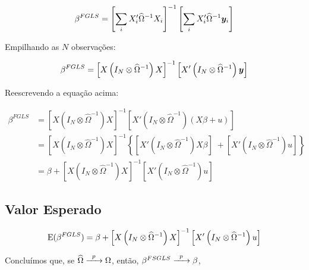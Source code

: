 \documentclass[11pt, oneside, a4paper, article]{article}
\numberwithin{equation}{section}
\begin{document}
\vspace{-1.5 em}
\begin{align*}
	\beta^{FGLS}
	= 
	\left[ 
		\sum_{i} X_{i}' \widehat{\Omega}^{-1} X_{i}
	\right]^{-1}
	\left[ 
		\sum_{i} X_{i}' \widehat{\Omega}^{-1} \boldsymbol{y}_{i}
	\right]
\end{align*}

Empilhando as $N$ observações:

\vspace{-1.5 em}
\begin{align*}
\beta^{FGLS}
= 
\left[ X \left( I_{N} \otimes \widehat{\Omega}^{-1} \right) X \right]^{-1}
\left[ X' \left( I_{N} \otimes \widehat{\Omega}^{-1} \right) \boldsymbol{y} \right]
\end{align*}

Reescrevendo a equação acima:

\vspace{-1.5 em}
\begin{align*}
\beta^{FGLS}
&= 
\left[  X \left( I_{N} \otimes \widehat{\Omega}^{-1} \right) X \right]^{-1}
\left[  X' \left( I_{N} \otimes \widehat{\Omega}^{-1} \right) (X \beta + u) \right]
\\
&= 
\left[ X \left( I_{N} \otimes \widehat{\Omega}^{-1} \right) X \right]^{-1}
\left\{ 
\left[ X' \left( I_{N} \otimes \widehat{\Omega}^{-1} \right) X \beta \right]
\; +
\left[ X' \left( I_{N} \otimes \widehat{\Omega}^{-1} \right) u \right]
\right\}
\\
&= 
\beta +
\left[ X \left( I_{N} \otimes \widehat{\Omega}^{-1} \right) X \right]^{-1}
\left[ X' \left( I_{N} \otimes \widehat{\Omega}^{-1} \right) u \right]
\end{align*}

\subsection*{Valor Esperado}

\vspace{-1 em}
\begin{align*}
\text{E}(\beta^{FGLS})
= 
\beta +
\left[ X \left( I_{N} \otimes \widehat{\Omega}^{-1} \right) X \right]^{-1}
\left[ X' \left( I_{N} \otimes \widehat{\Omega}^{-1} \right) u \right]
\end{align*}

Concluímos que, se 
$\widehat{\Omega} \xrightarrow{\enskip p \enskip} \Omega$,
então,
$\beta^{FSGLS} \xrightarrow{\enskip p \enskip} \beta$,
\end{document}
